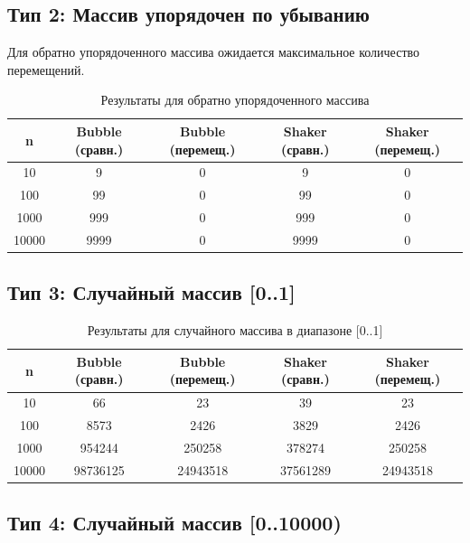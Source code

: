 \documentclass[a4paper,12pt,titlepage]{article}
\begin{document}
\subsection{Тип 2: Массив упорядочен по убыванию}

Для обратно упорядоченного массива ожидается максимальное количество перемещений.

\begin{table}[h]
\centering
\begin{tabular}{|c|c|c|c|c|}
    \hline
    \textbf{n} & \textbf{Bubble (сравн.)} & \textbf{Bubble (перемещ.)} & \textbf{Shaker (сравн.)} & \textbf{Shaker (перемещ.)} \\
    \hline
    10 & 9 & 0 & 9 & 0 \\
    100 & 99 & 0 & 99 & 0 \\
    1000 & 999 & 0 & 999 & 0 \\
    10000 & 9999 & 0 & 9999 & 0 \\
    \hline
\end{tabular}
\caption{Результаты для обратно упорядоченного массива}
\end{table}

\subsection{Тип 3: Случайный массив [0..1]}

\begin{table}[h]
\centering
\begin{tabular}{|c|c|c|c|c|}
    \hline
    \textbf{n} & \textbf{Bubble (сравн.)} & \textbf{Bubble (перемещ.)} & \textbf{Shaker (сравн.)} & \textbf{Shaker (перемещ.)} \\
    \hline
    10 & 66 & 23 & 39 & 23 \\
    100 & 8573 & 2426 & 3829 & 2426 \\
    1000 & 954244 & 250258 & 378274 & 250258 \\
    10000 & 98736125 & 24943518 & 37561289 & 24943518 \\
    \hline
\end{tabular}
\caption{Результаты для случайного массива в диапазоне [0..1]}
\end{table}

\subsection{Тип 4: Случайный массив [0..10000)}
\end{document}
